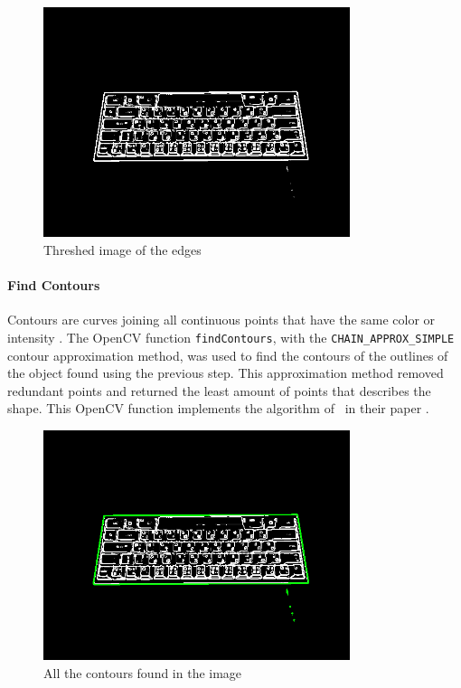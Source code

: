 \documentclass{report}
\begin{document}
\begin{figure}[H]
	\centering
	\includegraphics[width=0.8\textwidth]{threshed.png}
	\caption{Threshed image of the edges}
	\centering
\end{figure}


\paragraph{Find Contours}
\label{section:metho-algo-key-contours}
Contours are curves joining all continuous points that have the same color or
intensity \parencite{opencv-contours}. The OpenCV function
\texttt{findContours}, with the \texttt{CHAIN\_APPROX\_SIMPLE} contour
approximation method, was used to find the contours of the outlines of the
object found using the previous step. This approximation method removed
redundant points and returned the least amount of points that describes the
shape. This OpenCV function implements the algorithm of~\cite{contours} in their
paper .

\begin{figure}[H]
	\centering
	\includegraphics[width=0.8\textwidth]{find-contours.png}
	\caption{All the contours found in the image}
	\centering
\end{figure}
\end{document}
